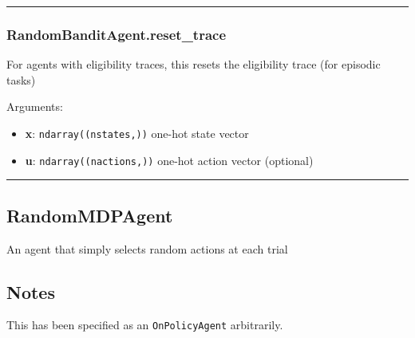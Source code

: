 \begin{center}\rule{0.5\linewidth}{\linethickness}\end{center}

\subsubsection{RandomBanditAgent.reset\_trace}\label{randombanditagent.reset_trace}

\begin{Shaded}
\begin{Highlighting}[]
\OperatorTok{=}\NormalTok{)}
\end{Highlighting}
\end{Shaded}

For agents with eligibility traces, this resets the eligibility trace
(for episodic tasks)

Arguments:

\begin{itemize}
\tightlist
\item
  \textbf{x}: \texttt{ndarray((nstates,))} one-hot state vector
\item
  \textbf{u}: \texttt{ndarray((nactions,))} one-hot action vector
  (optional)
\end{itemize}

\begin{center}\rule{0.5\linewidth}{\linethickness}\end{center}

\subsection{RandomMDPAgent}\label{randommdpagent}

\begin{Shaded}
\begin{Highlighting}[]
\end{Highlighting}
\end{Shaded}

An agent that simply selects random actions at each trial

\subsection{Notes}\label{notes}

This has been specified as an \texttt{OnPolicyAgent} arbitrarily.

